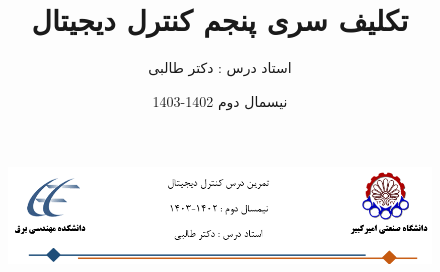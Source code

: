\documentclass[12pt]{article}
\title{تکلیف سری پنجم کنترل دیجیتال}
\date{نیسمال دوم 1402-1403}
\author{استاد درس : دکتر طالبی}
\begin{document}
\markboth{\theauthor}{\thetitle}



\begin{figure}[htbp]
    \centering
    \includegraphics[width=\linewidth]{Header.png}
\end{figure}


\end{document}

